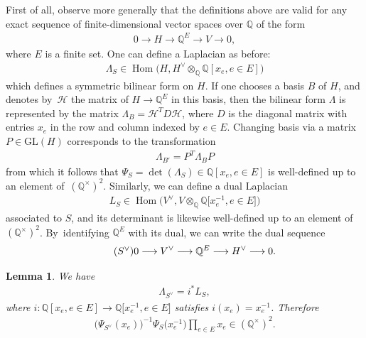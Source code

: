 \documentclass[pdftex]{sigma}%
\newtheorem{lem}[thm]{Lemma}
\numberwithin{equation}{section}
\newcommand{\To}{\longrightarrow}
\newcommand{\Q}{\mathbb Q}
\newcommand{\0}{\color{blue}{\mathsf{0}}}
\begin{document}
 First of all, observe more generally that the definitions above are valid for any exact sequence of finite-dimensional vector spaces over $\Q$ of the form
 \begin{gather} \tag{$S$}
 0 \To H \To \Q^E \To V \To 0,
 \end{gather}
 where $E$ is a finite set.
 One can define a Laplacian as before:
 \begin{gather*}
 \Lambda_S \in \operatorname{Hom}\big(H, H^{\vee} \otimes_{\Q} \Q[x_e, e \in E] \big)
 \end{gather*}
 which defines a symmetric bilinear form on $H$.
 If one chooses a basis $B$ of $H$, and denotes by~$\mathcal{H}$ the matrix of $H\rightarrow \Q^{E}$ in this basis, then the bilinear form $\Lambda$ is
 represented by the matrix
 $\Lambda_B = \mathcal{H}^T D \mathcal{H}$, where $D$ is the diagonal matrix with entries $x_e$ in the row and column indexed by $e\in E$. Changing basis via a matrix $P \in \mathrm{GL}(H)$ corresponds to the transformation
 \begin{gather} \label{LambdaTransformationMatroids}
 \Lambda_{B'} = P^T \Lambda_B P
 \end{gather}
 from which it follows that $\Psi_S= \det(\Lambda_S)\in \Q[x_e, e\in E]$ is well-defined up to an element of~$(\Q^{\times})^2$. Similarly, we can define a dual Laplacian
 \begin{gather*}
 L_S \in \operatorname{Hom}\big(V^{\vee}, V \otimes_{\Q} \Q\big[x_e^{-1}, e\in E \big] \big)
 \end{gather*}
associated to $S$, and its determinant is likewise well-defined up to an element of $(\Q^{\times})^2$. By~identifying $\Q^E$ with its dual, we can write the dual sequence
\begin{gather} \tag{$S^{\vee}$}
 0 \To V^{\vee} \To \Q^E \To H^{\vee} \To 0 .
 \end{gather}

\begin{lem} \label{lem: dualityandLG}
We have
\begin{gather*}
 \Lambda_{S^{\vee}} = i^* L_{S},
 \end{gather*}
 where $i\colon \Q[x_e, e\in E] \rightarrow \Q\big[x_{e}^{-1}, e\in E\big]$ satisfies $i(x_e) = x_e^{-1}$. Therefore
 \begin{gather*}
 \big( \Psi_{S^{\vee}}(x_e)\big)^{-1} \Psi_{S} \big(x_{e}^{-1}\big) \prod_{e \in E} x_e \in (\Q^{\times})^2.
 \end{gather*}
 \end{lem}
\end{document}
